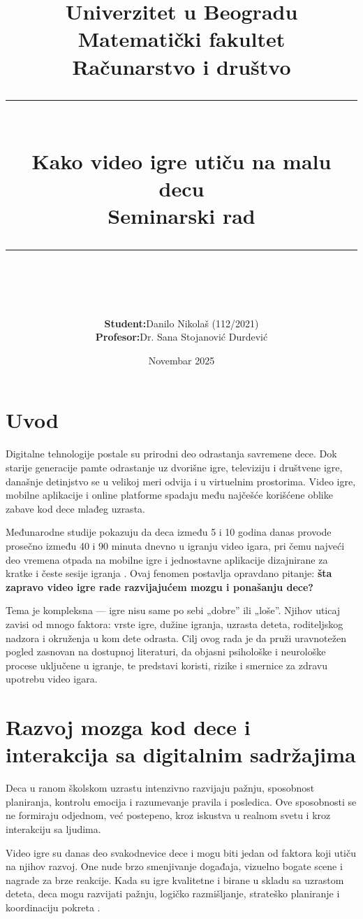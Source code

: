 \documentclass[a4paper,12pt]{article}
\title{%
\sffamily
\Large Univerzitet u Beogradu\\
\large Matematički fakultet\\[0.8em]
\textbf{Računarstvo i društvo}\\[1.2em]
\rule{\linewidth}{0.5pt}\\[0.6em]
\LARGE \textbf{Kako video igre utiču na malu decu}\\
\large Seminarski rad\\[0.6em]
\rule{\linewidth}{0.5pt}\\[1.2em]
}
\author{%
\sffamily
\begin{tabular}{@{}ll@{}}
\textbf{Student:} & Danilo Nikolaš (112/2021) \\
\textbf{Profesor:} & Dr. Sana Stojanović Durdević \\
\end{tabular}
}
\date{\sffamily Novembar 2025}
\begin{document}
\maketitle
\newpage
\tableofcontents
\newpage


\section{Uvod}

Digitalne tehnologije postale su prirodni deo odrastanja savremene dece. 
Dok starije generacije pamte odrastanje uz dvorišne igre, televiziju i društvene igre, 
današnje detinjstvo se u velikoj meri odvija i u virtuelnim prostorima. 
Video igre, mobilne aplikacije i online platforme spadaju među najčešće korišćene oblike zabave kod dece mlađeg uzrasta.

Međunarodne studije pokazuju da deca između 5 i 10 godina danas provode 
prosečno između 40 i 90 minuta dnevno u igranju video igara, 
pri čemu najveći deo vremena otpada na mobilne igre i jednostavne aplikacije 
dizajnirane za kratke i česte sesije igranja \cite{eu_kids_online_2023}. 
Ovaj fenomen postavlja opravdano pitanje: \textbf{šta zapravo video igre rade razvijajućem mozgu i ponašanju dece?}

Tema je kompleksna — igre nisu same po sebi „dobre” ili „loše”. 
Njihov uticaj zavisi od mnogo faktora: vrste igre, dužine igranja, uzrasta deteta, 
roditeljskog nadzora i okruženja u kom dete odrasta. 
Cilj ovog rada je da pruži uravnotežen pogled zasnovan na dostupnoj literaturi, 
da objasni psihološke i neurološke procese uključene u igranje, te predstavi koristi, rizike i smernice za zdravu upotrebu video igara.


\section{Razvoj mozga kod dece i interakcija sa digitalnim sadržajima}

Deca u ranom školskom uzrastu intenzivno razvijaju pažnju, sposobnost planiranja, kontrolu emocija i razumevanje pravila i posledica. Ove sposobnosti se ne formiraju odjednom, već postepeno, kroz iskustva u realnom svetu i kroz interakciju sa ljudima.

Video igre su danas deo svakodnevice dece i mogu biti jedan od faktora koji utiču na njihov razvoj. One nude brzo smenjivanje događaja, vizuelno bogate scene i nagrade za brze reakcije. Kada su igre kvalitetne i birane u skladu sa uzrastom deteta, deca mogu razvijati pažnju, logičko razmišljanje, strateško planiranje i koordinaciju pokreta \cite{granic2014benefits}. 
\end{document}
